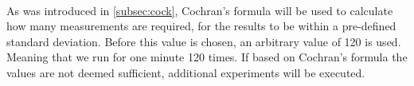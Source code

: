 \paragraph*{}
As was introduced in \cref{subsec:cock}, Cochran's formula will be used to calculate how many measurements are required, for the results to be within a pre-defined standard deviation. Before this value is chosen, an arbitrary value of 120 is used. Meaning that we run for one minute 120 times. 
If based on Cochran's formula the values are not deemed sufficient, additional experiments will be executed.




